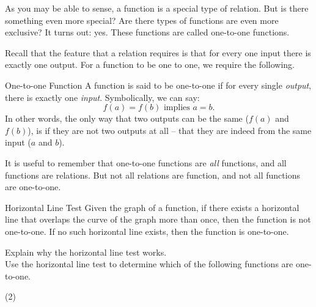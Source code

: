 \documentclass[12pt,fleqn]{book}
\begin{document}
As you may be able to sense, a function is a special type of relation.  But is there something even more special?  Are there types of functions are even more exclusive?  It turns out: yes.  These functions are called one-to-one functions.

Recall that the feature that a relation requires is that for every one input there is exactly one output. For a function to be one to one, we require the following.
\begin{defn}{One-to-one Function}{}
    A function is said to be one-to-one if for every single \emph{output}, there is exactly one \emph{input}.  Symbolically, we can say:
    \[ 
        f(a)=f(b) \text{ implies } a=b.
    \]
    In other words, the only way that two outputs can be the same ($f(a)$ and $f(b)$), is if they are not two outputs at all -- that they are indeed from the same input ($a$ and $b$).
    \end{defn}

    It is useful to remember that one-to-one functions are \emph{all} functions, and all functions are relations.  But not all relations are function, and not all functions are one-to-one.
    \\[1em]

\begin{defn}{Horizontal Line Test}{}
Given the graph of a function, if there exists a horizontal line that overlaps the curve of the graph more than once, then the function is not one-to-one.  If no such horizontal line exists, then the function is one-to-one.
\end{defn}
Explain why the horizontal line test works.
\\[2in]
Use the horizontal line test to determine which of the following functions are one-to-one.
\begin{tasks}(2)
\task {}
\task {}
\task {}
\task {}
\task {}
\task {}
\end{tasks}
\end{document}
